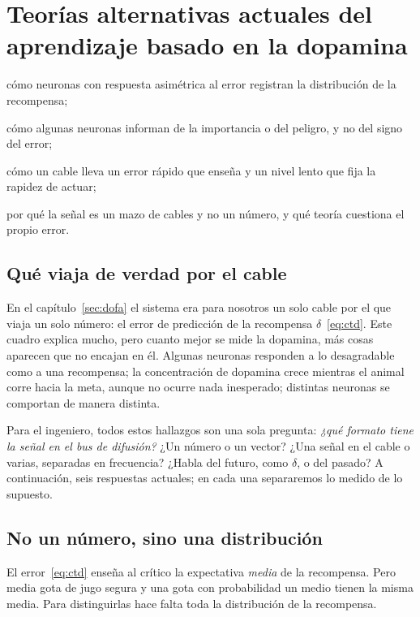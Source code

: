 \chapter{Teorías alternativas actuales del aprendizaje basado en la dopamina}
\label{sec:dofaalt}
\begin{chaptergoals}
\item cómo neuronas  con respuesta asimétrica al error registran la distribución de la recompensa;
\item cómo algunas neuronas  informan de la importancia o del peligro, y no del signo del error;
\item cómo un cable lleva un error rápido que enseña y un nivel lento que fija la rapidez de actuar;
\item por qué la señal  es un mazo de cables y no un número, y qué teoría cuestiona el propio error.
\end{chaptergoals}

\section{Qué viaja de verdad por el cable}

En el capítulo~\ref{sec:dofa} el sistema  era para nosotros un solo cable por el que viaja un solo número: el error de predicción de la recompensa $\delta$~\eqref{eq:ctd}. Este cuadro explica mucho, pero cuanto mejor se mide la dopamina, más cosas aparecen que no encajan en él. Algunas neuronas responden a lo desagradable como a una recompensa; la concentración de dopamina crece mientras el animal corre hacia la meta, aunque no ocurre nada inesperado; distintas neuronas  se comportan de manera distinta.

Para el ingeniero, todos estos hallazgos son una sola pregunta: \emph{¿qué formato tiene la señal en el bus de difusión?} ¿Un número o un vector? ¿Una señal en el cable o varias, separadas en frecuencia? ¿Habla del futuro, como $\delta$, o del pasado? A continuación, seis respuestas actuales; en cada una separaremos lo medido de lo supuesto.

\section{No un número, sino una distribución}

El error~\eqref{eq:ctd} enseña al crítico la expectativa \emph{media} de la recompensa. Pero media gota de jugo segura y una gota con probabilidad un medio tienen la misma media. Para distinguirlas hace falta toda la distribución de la recompensa.

